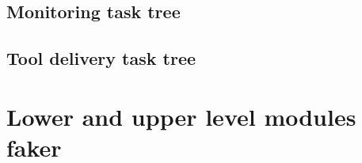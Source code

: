 \subsection{Monitoring task tree}
\label{sec:MonitoringTaskTree}

\subsection{Tool delivery task tree}
\label{sec:ToolDeliveryTaskTree}

\section{Lower and upper level modules faker}
\label{sec:LowerAndUpperLevelModulesFaker}
